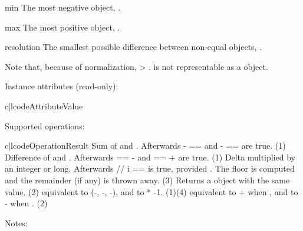 \begin{memberdesc}{min}
  The most negative  object,
  .
\end{memberdesc}

\begin{memberdesc}{max}
  The most positive  object,
  .
\end{memberdesc}

\begin{memberdesc}{resolution}
  The smallest possible difference between non-equal
   objects, .
\end{memberdesc}

Note that, because of normalization,  \textgreater
{}.   is not representable as
a  object.

Instance attributes (read-only):

\begin{tableii}{c|l}{code}{Attribute}{Value}
\end{tableii}

Supported operations:

\begin{tableii}{c|l}{code}{Operation}{Result}
          {Sum of  and .
           Afterwards - ==  and -
           ==  are true.
          (1)}
          {Difference of  and .
           Afterwards  ==  -  and  ==  +  are
           true.
          (1)}
          {Delta multiplied by an integer or long.
           Afterwards  // i ==  is true,
           provided .}
          {The floor is computed and the remainder (if any) is thrown away.
          (3)}
          {Returns a  object with the same value.
          (2)}
          {equivalent to (-, -,
           -), and to * -1.
          (1)(4)}
          {equivalent to + when , and to
           - when .
          (2)}
\end{tableii}
\noindent
Notes:

